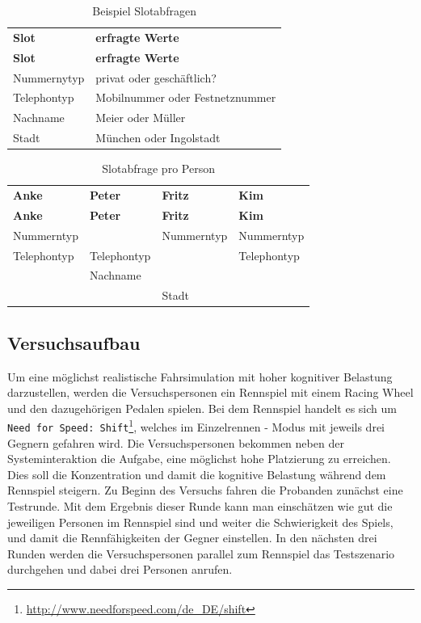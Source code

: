 \documentclass[12pt,a4paper]{scrartcl}
\begin{document}
\begin{longtable}{p{6cm}p{8cm}}
	\label{slots}\\
	\caption[Slotabfragen]{Beispiel Slotabfragen}\\
	\hline
	\textbf{Slot} &	\textbf{erfragte Werte}\\
	\hline
	\endfirsthead
	\hline
	\textbf{Slot} &	\textbf{erfragte Werte}\\
	\hline
	\endhead
Nummernytyp & privat oder geschäftlich?\\
Telephontyp & Mobilnummer oder Festnetznummer\\
Nachname & Meier oder Müller\\
Stadt & München oder Ingolstadt\\


\hline
\end{longtable}


\begin{longtable}{p{}p{}p{}p{}}
	\label{slotsPerson}\\
	\caption[Slotabfrage pro Person]{Slotabfrage pro Person}\\
	\hline
	\textbf{Anke}&\textbf{Peter}&\textbf{Fritz} &\textbf{Kim}\\
	\hline
	\endfirsthead
	\hline
	\textbf{Anke}&\textbf{Peter}&\textbf{Fritz} &\textbf{Kim}\\
	\hline
	\endhead
Nummerntyp & & Nummerntyp & Nummerntyp\\
Telephontyp & Telephontyp & & Telephontyp \\
& Nachname & & \\
& & Stadt & \\

\hline
\end{longtable}


\subsection{Versuchsaufbau}
Um eine möglichst realistische Fahrsimulation mit hoher kognitiver Belastung darzustellen, werden die Versuchspersonen ein Rennspiel mit einem Racing Wheel und den dazugehörigen Pedalen spielen. Bei dem Rennspiel handelt es sich um \texttt{Need for Speed: Shift}\footnote{\label{foot:nfs}\url{http://www.needforspeed.com/de_DE/shift}}, welches im Einzelrennen - Modus mit jeweils drei Gegnern gefahren wird. Die Versuchspersonen bekommen neben der Systeminteraktion die Aufgabe, eine möglichst hohe Platzierung zu erreichen. Dies soll die Konzentration und damit die kognitive Belastung während dem Rennspiel steigern. Zu Beginn des Versuchs fahren die Probanden zunächst eine Testrunde. Mit dem Ergebnis dieser Runde kann man einschätzen wie gut die jeweiligen Personen im Rennspiel sind und weiter die Schwierigkeit des Spiels, und damit die Rennfähigkeiten der Gegner einstellen. In den nächsten drei Runden werden die Versuchspersonen parallel zum Rennspiel das Testszenario durchgehen und dabei drei Personen anrufen. 
\end{document}
